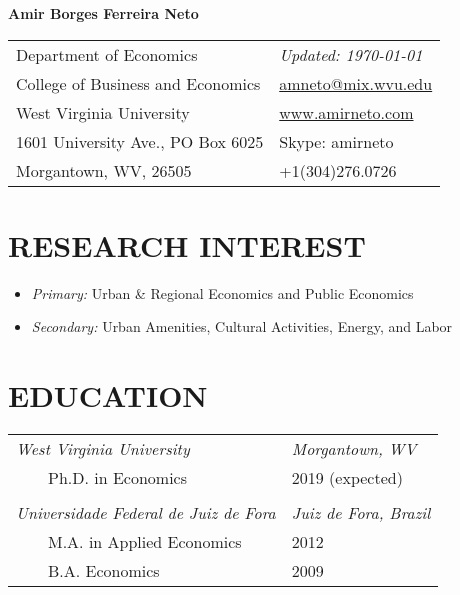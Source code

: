 \documentclass[11pt,a4paper,oneside]{article}
\begin{document}
\begin{center}
  \Large{\textbf{Amir Borges Ferreira Neto}} \\
\end{center}

\noindent
{}
\begin{tabularx}{\textwidth}{lR}
Department of Economics           & \emph{Updated: \today}  \\
College of Business and Economics & \href{mailto: Your email}{amneto@mix.wvu.edu} \\
West Virginia University          & \href{http:// Your web address}{www.amirneto.com}\\
1601 University Ave., PO Box 6025 & Skype: amirneto\\
Morgantown, WV, 26505  & +1(304)276.0726\\
\end{tabularx}

\section{RESEARCH INTEREST}
\begin{itemize}[label={}]
  \item \emph{Primary:} Urban \& Regional Economics and Public Economics
  \item \emph{Secondary:} Urban Amenities, Cultural Activities, Energy, and Labor
\end{itemize}

\section{EDUCATION}
\noindent
\begin{tabularx}{\textwidth}{lR}
\emph{West Virginia University} & \emph{Morgantown, WV} \\
$\qquad$Ph.D. in Economics              & 2019 (expected) \\
\\
\emph{Universidade Federal de Juiz de Fora} & \emph{Juiz de Fora, Brazil} \\
$\qquad$M.A. in Applied Economics     & 2012 \\
$\qquad$B.A. Economics     & 2009 \\
\end{tabularx}
\end{document}
